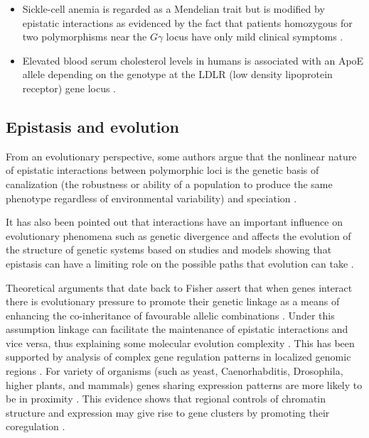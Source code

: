 \begin{itemize}
	\item Sickle-cell anemia is regarded as a Mendelian trait but is modified by epistatic interactions as evidenced by the fact that patients homozygous for two polymorphisms near the $G\gamma$ locus have only mild clinical symptoms \cite{odenheimer1983heterogeneity}.

	\item Elevated blood serum cholesterol levels in humans is associated with an ApoE allele depending on the genotype at the LDLR (low density lipoprotein receptor) gene locus \cite{pedersen1989interaction}.

\end{itemize}

\subsection{Epistasis and evolution}

From an evolutionary perspective, some authors argue that the nonlinear nature of epistatic interactions between polymorphic loci is the genetic basis of canalization (the robustness or ability of a population to produce the same phenotype regardless of environmental variability) and speciation \cite{huang2012epistasis}.

It has also been pointed out that interactions have an important influence on evolutionary phenomena such as genetic divergence and affects the evolution of the structure of genetic systems \cite{phillips2008epistasis} based on studies and models showing that epistasis can have a limiting role on the possible paths that evolution can take \cite{miller2006direct}.

Theoretical arguments that date back to Fisher assert that when genes interact there is evolutionary pressure to promote their genetic linkage as a means of enhancing the co-inheritance of favourable allelic combinations \cite{fisher1958genetical}.
Under this assumption linkage can facilitate the maintenance of epistatic interactions and vice versa, thus explaining some molecular evolution complexity \cite{phillips2008epistasis}.
This has been supported by analysis of complex gene regulation patterns in localized genomic regions \cite{birney2007identification}.
For variety of organisms (such as yeast, Caenorhabditis, Drosophila, higher plants, and mammals) genes sharing expression patterns are more likely to be in proximity \cite{hurst2004evolutionary}.
This evidence shows that regional controls of chromatin structure and expression may give rise to gene clusters by promoting their coregulation \cite{petkov2005evidence}.

